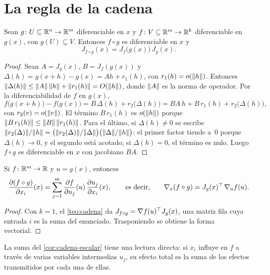\section{La regla de la cadena}

\begin{teorema}\label{teo:cadena}
Sean $g\colon U\subseteq\mathbb{R}^{n}\to\mathbb{R}^{m}$ diferenciable en $x$ y $f\colon V\subseteq\mathbb{R}^{m}\to\mathbb{R}^{k}$ diferenciable en $g(x)$, con $g(U)\subseteq V$. Entonces $f\circ g$ es diferenciable en $x$ y
\[
J_{f\circ g}(x)=J_f\bigl(g(x)\bigr)\,J_g(x).
\]
\end{teorema}

\begin{proof}
Sean $A=J_g(x)$, $B=J_f(g(x))$ y $\Delta(h)=g(x+h)-g(x)=Ah+r_1(h)$, con $r_1(h)=o(\lVert h\rVert)$. Entonces $\lVert\Delta(h)\rVert\le\lVert A\rVert\,\lVert h\rVert+\lVert r_1(h)\rVert=O(\lVert h\rVert)$, donde $\lVert A\rVert$ es la norma de operador. Por la diferenciabilidad de $f$ en $g(x)$,
\[
f\bigl(g(x+h)\bigr)-f\bigl(g(x)\bigr)=B\,\Delta(h)+r_2\bigl(\Delta(h)\bigr)=BA\,h+B\,r_1(h)+r_2\bigl(\Delta(h)\bigr),
\]
con $r_2(v)=o(\lVert v\rVert)$. El término $B\,r_1(h)$ es $o(\lVert h\rVert)$ porque $\lVert B\,r_1(h)\rVert\le\lVert B\rVert\,\lVert r_1(h)\rVert$. Para el último, si $\Delta(h)\ne 0$ se escribe $\lVert r_2(\Delta)\rVert/\lVert h\rVert=\bigl(\lVert r_2(\Delta)\rVert/\lVert\Delta\rVert\bigr)\bigl(\lVert\Delta\rVert/\lVert h\rVert\bigr)$: el primer factor tiende a~0 porque $\Delta(h)\to 0$, y el segundo está acotado; si $\Delta(h)=0$, el término es nulo. Luego $f\circ g$ es diferenciable en $x$ con jacobiano $BA$.
\end{proof}

\begin{corolario}\label{cor:cadena-escalar}
Si $f\colon\mathbb{R}^{m}\to\mathbb{R}$ y $u=g(x)$, entonces
\[
\frac{\partial (f\circ g)}{\partial x_i}(x)=\sum_{j=1}^{m}\frac{\partial f}{\partial u_j}(u)\,\frac{\partial u_j}{\partial x_i}(x),
\qquad\text{es decir,}\qquad
\nabla_x (f\circ g)=J_g(x)^{\top}\,\nabla_u f(u).
\]
\end{corolario}

\begin{proof}
Con $k=1$, el \cref{teo:cadena} da $J_{f\circ g}=\nabla f(u)^{\top} J_g(x)$, una matriz fila cuya entrada $i$ es la suma del enunciado. Trasponiendo se obtiene la forma vectorial.
\end{proof}

La suma del \cref{cor:cadena-escalar} tiene una lectura directa: si $x_i$ influye en $f$ a través de varias variables intermedias $u_j$, su efecto total es la suma de los efectos transmitidos por cada una de ellas.

